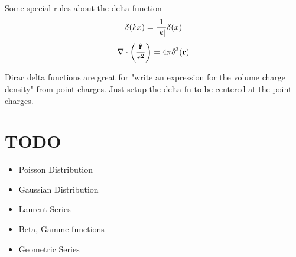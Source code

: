 \documentclass{article}
\newcommand{\vh}[1]{\hat{\vb{#1}}}
\begin{document}
Some special rules about the delta function
$$
\delta(kx) = \frac{1}{\abs{k}} \delta(x)
$$
$$
\nabla \cdot \left( \frac{\vh{r}}{r^2} \right) = 4\pi\delta^3(\vb{r})
$$

Dirac delta functions are great for "write an expression for the volume charge density" from point charges.  Just setup the delta fn to be centered at the point charges.



\section{TODO}
\begin{itemize}
	\item Poisson Distribution
	\item Gaussian Distribution
	\item Laurent Series
	\item Beta, Gamme functions
	\item Geometric Series
\end{itemize}
\end{document}
